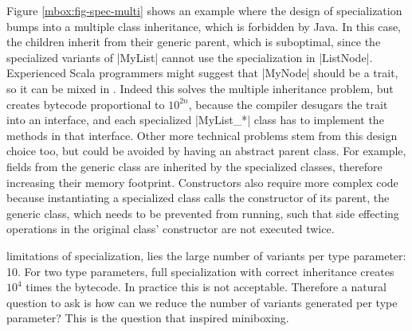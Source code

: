  Figure \ref{mbox:fig-spec-multi} shows an example where the design of specialization bumps into a multiple class inheritance, which is forbidden by Java. In this case, the children inherit from their generic parent, which is suboptimal, since the specialized variants of |MyList| cannot use the specialization in |ListNode|. Experienced Scala programmers might suggest that |MyNode| should be a trait, so it can be mixed in \cite{scalable-component-abstractions}. Indeed this solves the multiple inheritance problem, but creates bytecode proportional to $10^{2n}$, because the compiler desugars the trait into an interface, and each specialized |MyList_*| class has to implement the methods in that interface. Other more technical problems stem from this design choice too, but could be avoided by having an abstract parent class. For example, fields from the generic class are inherited by the specialized classes, therefore increasing their memory footprint. Constructors also require more complex code because instantiating a specialized class calls the constructor of its parent, the generic class, which needs to be prevented from running, such that side effecting operations in the original class' constructor are not executed twice.

 limitations of specialization, lies the large number of variants per type parameter: 10. For two type parameters, full specialization with correct inheritance creates $10^4$ times the bytecode. In practice this is not acceptable. Therefore a natural question to ask is how can we reduce the number of variants generated per type parameter? This is the question that inspired miniboxing.

